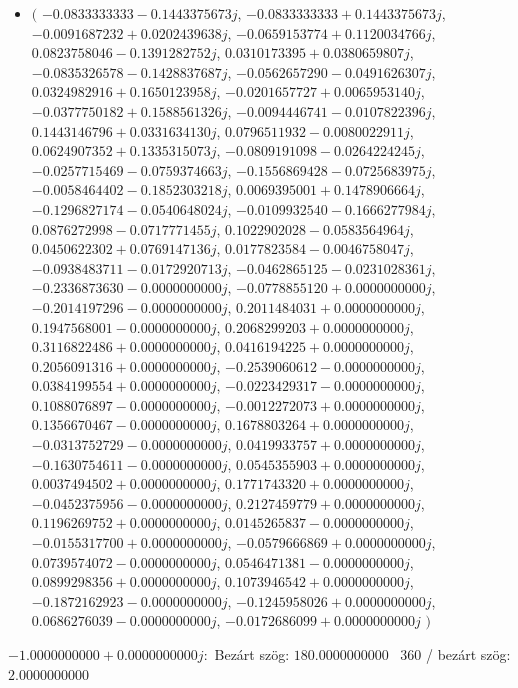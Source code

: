 \documentclass[14pt,a4paper]{article}
\begin{document}
\begin{itemize}
\item
$\big($
$-0.0833333333-0.1443375673j$, $-0.0833333333+0.1443375673j$, $-0.0091687232+0.0202439638j$, $-0.0659153774+0.1120034766j$, $0.0823758046-0.1391282752j$, $0.0310173395+0.0380659807j$, $-0.0835326578-0.1428837687j$, $-0.0562657290-0.0491626307j$, $0.0324982916+0.1650123958j$, $-0.0201657727+0.0065953140j$, $-0.0377750182+0.1588561326j$, $-0.0094446741-0.0107822396j$, $0.1443146796+0.0331634130j$, $0.0796511932-0.0080022911j$, $0.0624907352+0.1335315073j$, $-0.0809191098-0.0264224245j$, $-0.0257715469-0.0759374663j$, $-0.1556869428-0.0725683975j$, $-0.0058464402-0.1852303218j$, $0.0069395001+0.1478906664j$, $-0.1296827174-0.0540648024j$, $-0.0109932540-0.1666277984j$, $0.0876272998-0.0717771455j$, $0.1022902028-0.0583564964j$, $0.0450622302+0.0769147136j$, $0.0177823584-0.0046758047j$, $-0.0938483711-0.0172920713j$, $-0.0462865125-0.0231028361j$, $-0.2336873630-0.0000000000j$, $-0.0778855120+0.0000000000j$, $-0.2014197296-0.0000000000j$, $0.2011484031+0.0000000000j$, $0.1947568001-0.0000000000j$, $0.2068299203+0.0000000000j$, $0.3116822486+0.0000000000j$, $0.0416194225+0.0000000000j$, $0.2056091316+0.0000000000j$, $-0.2539060612-0.0000000000j$, $0.0384199554+0.0000000000j$, $-0.0223429317-0.0000000000j$, $0.1088076897-0.0000000000j$, $-0.0012272073+0.0000000000j$, $0.1356670467-0.0000000000j$, $0.1678803264+0.0000000000j$, $-0.0313752729-0.0000000000j$, $0.0419933757+0.0000000000j$, $-0.1630754611-0.0000000000j$, $0.0545355903+0.0000000000j$, $0.0037494502+0.0000000000j$, $0.1771743320+0.0000000000j$, $-0.0452375956-0.0000000000j$, $0.2127459779+0.0000000000j$, $0.1196269752+0.0000000000j$, $0.0145265837-0.0000000000j$, $-0.0155317700+0.0000000000j$, $-0.0579666869+0.0000000000j$, $0.0739574072-0.0000000000j$, $0.0546471381-0.0000000000j$, $0.0899298356+0.0000000000j$, $0.1073946542+0.0000000000j$, $-0.1872162923-0.0000000000j$, $-0.1245958026+0.0000000000j$, $0.0686276039-0.0000000000j$, $-0.0172686099+0.0000000000j$
$\big)$
\end{itemize}
$-1.0000000000+0.0000000000j$:\
Bezárt szög: $180.0000000000$ \
360 / bezárt szög: $2.0000000000$\
\end{document}
